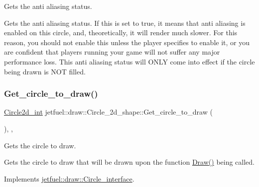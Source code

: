 Gets the anti aliasing status. 

Gets the anti aliasing status. If this is set to true, it means that anti aliasing is enabled on this circle, and, theoretically, it will render much slower. For this reason, you should not enable this unless the player specifies to enable it, or you are confident that players running your game will not suffer any major performance loss. This anti aliasing status will O\+N\+LY come into effect if the circle being drawn is N\+OT filled. \mbox{\label{classjetfuel_1_1draw_1_1Circle__2d__shape_ab188ed6716dff22d0498a01ac1e93d90}} 
\subsubsection{\texorpdfstring{Get\+\_\+circle\+\_\+to\+\_\+draw()}{Get\_circle\_to\_draw()}}
{\footnotesize\ttfamily \hyperlink{classjetfuel_1_1draw_1_1Circle2d}{Circle2d\+\_\+int} jetfuel\+::draw\+::\+Circle\+\_\+2d\+\_\+shape\+::\+Get\+\_\+circle\+\_\+to\+\_\+draw (\begin{DoxyParamCaption}{ }\end{DoxyParamCaption})\hspace{0.3cm}{\ttfamily [inline]}, {\ttfamily [override]}, {\ttfamily [virtual]}}



Gets the circle to draw. 

Gets the circle to draw that will be drawn upon the function \hyperlink{classjetfuel_1_1draw_1_1Circle__2d__shape_a8be660f3cd624dc077d9003ee3b37212}{Draw()} being called. 

Implements \hyperlink{classjetfuel_1_1draw_1_1Circle__interface_a992a93bc130288ec4c9c4d2fa4203341}{jetfuel\+::draw\+::\+Circle\+\_\+interface}.

\mbox{\label{classjetfuel_1_1draw_1_1Circle__2d__shape_ad7953fa383fdffedf6cdf9d6a3d9a1bb}} 
